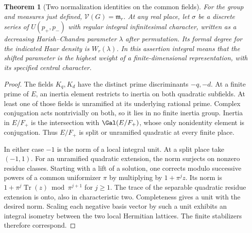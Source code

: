 \documentclass[a4paper,11pt]{article}
\newtheorem{theorem}[proposition]{Theorem}
\theoremstyle{definition}
\theoremstyle{remark}
\numberwithin{equation}{section}
\begin{document}
\begin{theorem}[Two normalization identities on the common fields]
\label{thm:norm91}
For the group and measures just defined, \(\mathcal V(G)=\mathfrak m_r\).
At any real place, let \(\sigma\) be a discrete series of
\(U(p_+,p_-)\) with regular integral infinitesimal character,
written as a decreasing Harish--Chandra parameter \(\lambda\)
after permutation. Its formal degree for the indicated Haar
density is \(W_r(\lambda)\). In this assertion integral means
that the shifted parameter is the highest weight of a
finite-dimensional representation, with its specified central
character.
\end{theorem}
\begin{proof}
The fields \(K_q,K_d\) have the distinct prime discriminants
\(-q,-d\). At a finite prime of \(E\), an inertia element
restricts to inertia on both quadratic subfields. At least one
of those fields is unramified at its underlying rational prime.
Complex conjugation acts nontrivially on both, so it lies in no
finite inertia group. Inertia in \(E/F_+\) is the intersection
with \(\Gal(E/F_+)\), whose only nonidentity element is
conjugation. Thus \(E/F_+\) is split or unramified quadratic
at every finite place.

In either case \(-1\) is the norm of a local integral unit.
At a split place take \((-1,1)\). For an unramified quadratic
extension, the norm surjects on nonzero residue classes.
Starting with a lift of a solution, one corrects modulo
successive powers of a common uniformizer \(\pi\) by multiplying
by \(1+\pi^j z\). Its norm is
\(1+\pi^j\operatorname{Tr}(z)\bmod\pi^{j+1}\) for \(j\ge1\).
The trace of the separable quadratic residue extension is onto,
also in characteristic two. Completeness gives a unit with the
desired norm. Scaling each negative basis vector by such a unit
exhibits an integral isometry between the two local Hermitian
lattices. The finite stabilizers therefore correspond.


\end{proof}
\end{document}
